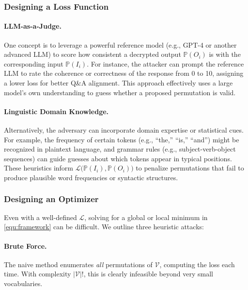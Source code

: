 \documentclass[10pt]{article}
\begin{document}
\subsubsection{Designing a Loss Function}
\label{subsubsec:loss_design}

\paragraph{LLM-as-a-Judge.}
One concept is to leverage a powerful reference model (e.g., GPT-4 or another advanced LLM) to score how consistent a decrypted output $\mathbb{P}(O_i)$ is with the corresponding input $\mathbb{P}(I_i)$. For instance, the attacker can prompt the reference LLM to rate the coherence or correctness of the response from 0 to 10, assigning a lower loss for better Q\&A alignment. This approach effectively uses a large model’s own understanding to guess whether a proposed permutation is valid.

\paragraph{Linguistic Domain Knowledge.}
Alternatively, the adversary can incorporate domain expertise or statistical cues. For example, the frequency of certain tokens (e.g., “the,” “is,” “and”) might be recognized in plaintext language, and grammar rules (e.g., subject-verb-object sequences) can guide guesses about which tokens appear in typical positions. These heuristics inform $\mathcal{L}\bigl(\mathbb{P}(I_i),\mathbb{P}(O_i)\bigr)$ to penalize permutations that fail to produce plausible word frequencies or syntactic structures.

\subsubsection{Designing an Optimizer}
\label{subsubsec:optimizer_design}

Even with a well-defined $\mathcal{L}$, solving for a global or local minimum in \eqref{equ:framework} can be difficult. We outline three heuristic attacks:

\paragraph{Brute Force.}
The naive method enumerates \textit{all} permutations of $\mathcal{V}$, computing the loss each time. With complexity $|\mathcal{V}|!$, this is clearly infeasible beyond very small vocabularies.
\end{document}
